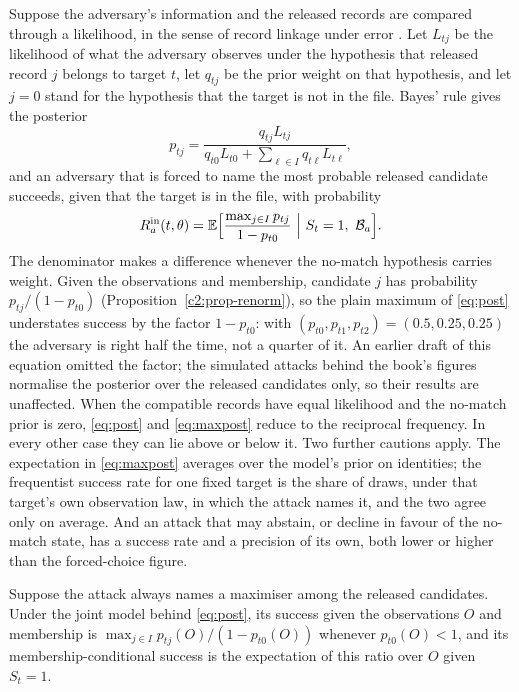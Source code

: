 Suppose the adversary's information and the released records are compared through
a likelihood, in the sense of record linkage under error \citep{fellegi1969}. Let
$L_{tj}$ be the likelihood of what the adversary observes under the hypothesis that
released record $j$ belongs to target $t$, let $q_{tj}$ be the prior weight on that
hypothesis, and let $j = 0$ stand for the hypothesis that the target is not in the
file. Bayes' rule gives the posterior
\begin{equation}\label{eq:post}
p_{tj} = \frac{q_{tj}L_{tj}}{q_{t0}L_{t0} + \sum_{\ell \in I} q_{t\ell}L_{t\ell}},
\end{equation}
and an adversary that is forced to name the most probable released candidate succeeds, given that the target is in the file, with probability
\begin{equation}\label{eq:maxpost}
R^{\mathrm{in}}_a(t,\theta) = \mathbb{E}\Big[\frac{\max_{j \in I} p_{tj}}{1-p_{t0}} \ \Big|\ S_t = 1,\ \mathcal{B}_a\Big].
\end{equation}
The denominator makes a difference whenever the no-match hypothesis carries weight. Given the observations and membership, candidate $j$ has probability $p_{tj}/(1-p_{t0})$ (Proposition~\ref{c2:prop-renorm}), so the plain maximum of \eqref{eq:post} understates success by the factor $1-p_{t0}$: with $(p_{t0},p_{t1},p_{t2})=(0.5,0.25,0.25)$ the adversary is right half the time, not a quarter of it. An earlier draft of this equation omitted the factor; the simulated attacks behind the book's figures normalise the posterior over the released candidates only, so their results are unaffected. When the compatible records have equal likelihood and the no-match prior is zero, \eqref{eq:post} and \eqref{eq:maxpost} reduce to the reciprocal frequency. In every other case they can lie above or below it. Two further cautions apply. The expectation in \eqref{eq:maxpost} averages over the model's prior on identities; the frequentist success rate for one fixed target is the share of draws, under that target's own observation law, in which the attack names it, and the two agree only on average. And an attack that may abstain, or decline in favour of the no-match state, has a success rate and a precision of its own, both lower or higher than the forced-choice figure.

\begin{proposition}\label{c2:prop-renorm}
Suppose the attack always names a maximiser among the released candidates. Under the joint model behind \eqref{eq:post}, its success given the observations $O$ and membership is $\max_{j\in I}p_{tj}(O)/(1-p_{t0}(O))$ whenever $p_{t0}(O)<1$, and its membership-conditional success is the expectation of this ratio over $O$ given $S_t=1$.
\end{proposition}

